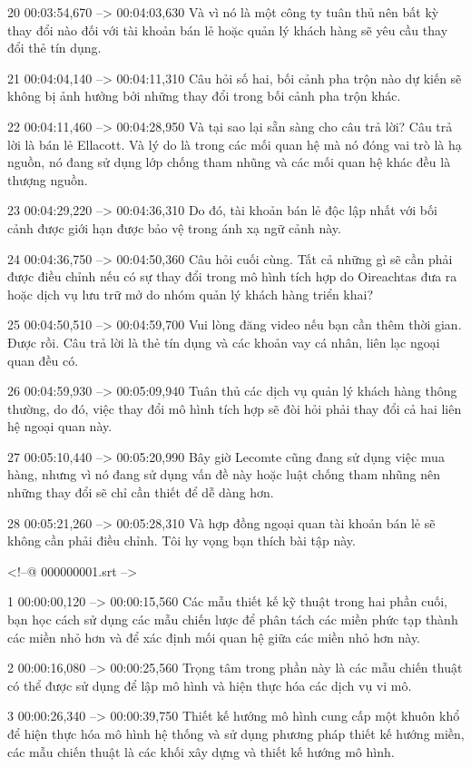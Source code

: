 20
00:03:54,670 --> 00:04:03,630
Và vì nó là một công ty tuân thủ nên bất kỳ thay đổi nào đối với tài khoản bán lẻ hoặc quản lý khách hàng sẽ yêu cầu thay đổi thẻ tín dụng.

21
00:04:04,140 --> 00:04:11,310
Câu hỏi số hai, bối cảnh pha trộn nào dự kiến ​​sẽ không bị ảnh hưởng bởi những thay đổi trong bối cảnh pha trộn khác.

22
00:04:11,460 --> 00:04:28,950
Và tại sao lại sẵn sàng cho câu trả lời?  Câu trả lời là bán lẻ Ellacott.  Và lý do là trong các mối quan hệ mà nó đóng vai trò là hạ nguồn, nó đang sử dụng lớp chống tham nhũng và các mối quan hệ khác đều là thượng nguồn.

23
00:04:29,220 --> 00:04:36,310
Do đó, tài khoản bán lẻ độc lập nhất với bối cảnh được giới hạn được bảo vệ trong ánh xạ ngữ cảnh này.

24
00:04:36,750 --> 00:04:50,360
Câu hỏi cuối cùng.  Tất cả những gì sẽ cần phải được điều chỉnh nếu có sự thay đổi trong mô hình tích hợp do Oireachtas đưa ra hoặc dịch vụ lưu trữ mở do nhóm quản lý khách hàng triển khai?

25
00:04:50,510 --> 00:04:59,700
Vui lòng đăng video nếu bạn cần thêm thời gian.  Được rồi.  Câu trả lời là thẻ tín dụng và các khoản vay cá nhân, liên lạc ngoại quan đều có.

26
00:04:59,930 --> 00:05:09,940
Tuân thủ các dịch vụ quản lý khách hàng thông thường, do đó, việc thay đổi mô hình tích hợp sẽ đòi hỏi phải thay đổi cả hai liên hệ ngoại quan này.

27
00:05:10,440 --> 00:05:20,990
Bây giờ Lecomte cũng đang sử dụng việc mua hàng, nhưng vì nó đang sử dụng vấn đề này hoặc luật chống tham nhũng nên những thay đổi sẽ chỉ cần thiết để dễ dàng hơn.

28
00:05:21,260 --> 00:05:28,310
Và hợp đồng ngoại quan tài khoản bán lẻ sẽ không cần phải điều chỉnh.  Tôi hy vọng bạn thích bài tập này.

<!--@ 000000001.srt -->

1
00:00:00,120 --> 00:00:15,560
Các mẫu thiết kế kỹ thuật trong hai phần cuối, bạn học cách sử dụng các mẫu chiến lược để phân tách các miền phức tạp thành các miền nhỏ hơn và để xác định mối quan hệ giữa các miền nhỏ hơn này.

2
00:00:16,080 --> 00:00:25,560
Trọng tâm trong phần này là các mẫu chiến thuật có thể được sử dụng để lập mô hình và hiện thực hóa các dịch vụ vi mô.

3
00:00:26,340 --> 00:00:39,750
Thiết kế hướng mô hình cung cấp một khuôn khổ để hiện thực hóa mô hình hệ thống và sử dụng phương pháp thiết kế hướng miền, các mẫu chiến thuật là các khối xây dựng và thiết kế hướng mô hình.

